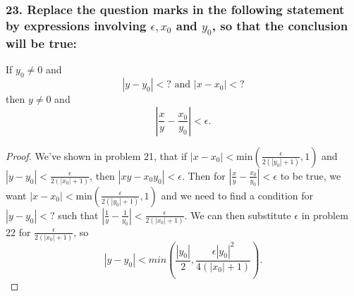 \documentclass{article}
\begin{document}
\subsubsection*{23. Replace the question marks in the following statement by expressions involving $\epsilon, x_0$ and $y_0$, so that the conclusion will be true:}
If $y_0 \ne 0$ and \[ \left|y - y_0\right| < ? \text{ and } \left|x - x_0\right|< ? \] then $y \ne 0$ and \[ \left|\frac{x}{y} - \frac{x_0}{y_0}\right| < \epsilon. \]
\begin{proof}
	We've shown in problem 21, that if $|x - x_0| < \text{min}(\frac{\epsilon}{2(|y_0| + 1)}, 1)$ and $|y - y_0| < \frac{\epsilon}{2(|x_0| + 1)}$, then $|xy - x_0y_0| < \epsilon$. Then for $\left|\frac{x}{y} - \frac{x_0}{y_0}\right| < \epsilon$ to be true, we want $|x - x_0| < \text{min}(\frac{\epsilon}{2(|y_0| + 1)}, 1)$ and we need to find a condition for $|y - y_0| < ?$ such that $|\frac{1}{y} - \frac{1}{y_0}| < \frac{\epsilon}{2(|x_0| + 1)}$. We can then substitute $\epsilon$ in problem 22 for $\frac{\epsilon}{2(|x_0| + 1)}$, so \[ |y - y_0| < min(\frac{|y_0|}{2}, \frac{\epsilon|y_0|^2}{4(|x_0| + 1)}). \]
\end{proof}
\end{document}
